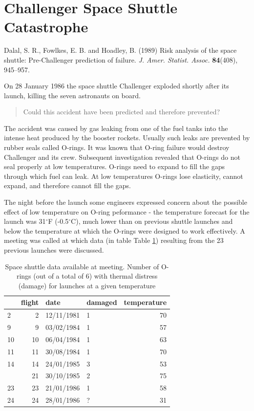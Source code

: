 \documentclass[
  british,
  11pt,
  openany, a4paper]{book}
\begin{document}
\section{Challenger Space Shuttle Catastrophe}\label{shuttle}

Dalal, S. R., Fowlkes, E. B. and Hoadley, B. (1989) Risk analysis of the space shuttle: Pre-Challenger prediction of failure. \emph{J. Amer. Statist. Assoc.} \textbf{84}(408), 945--957.

On 28 January 1986 the space shuttle Challenger exploded shortly after its launch, killing the seven astronauts on board.

\begin{quote}
Could this accident have been predicted and therefore prevented?
\end{quote}

The accident was caused by gas leaking from one of the fuel tanks into the intense heat produced by the booster rockets. Usually such leaks are prevented by rubber seals called O-rings. It was known that O-ring failure would destroy Challenger and its crew. Subsequent investigation revealed that O-rings do not seal properly at low temperatures. O-rings need to expand to fill the gaps through which fuel can leak. At low temperatures O-rings lose elasticity, cannot expand, and therefore cannot fill the gaps.

The night before the launch some engineers expressed concern about the possible effect of low temperature on O-ring peformance - the temperature forecast for
the launch was 31\(^\circ\)F (-0.5\(^\circ\)C), much lower than on previous shuttle launches and below the temperature at which the O-rings were designed to work effectively. A meeting was called at which data (in table Table \ref{tab:tabshuttle1}) resulting from the 23 previous launches were discussed.

\begin{table}

\caption{\label{tab:tabshuttle1}Space shuttle data available at meeting. Number of O-rings (out of a total of 6) with thermal distress (damage) for launches at a given temperature}
\centering
\begin{tabular}[t]{lrllr}
\toprule
  & flight & date & damaged & temperature\\
\midrule
2 & 2 & 12/11/1981 & 1 & 70\\
9 & 9 & 03/02/1984 & 1 & 57\\
10 & 10 & 06/04/1984 & 1 & 63\\
11 & 11 & 30/08/1984 & 1 & 70\\
14 & 14 & 24/01/1985 & 3 & 53\\
\addlinespace
21 & 21 & 30/10/1985 & 2 & 75\\
23 & 23 & 21/01/1986 & 1 & 58\\
24 & 24 & 28/01/1986 & ? & 31\\
\bottomrule
\end{tabular}
\end{table}
\end{document}
